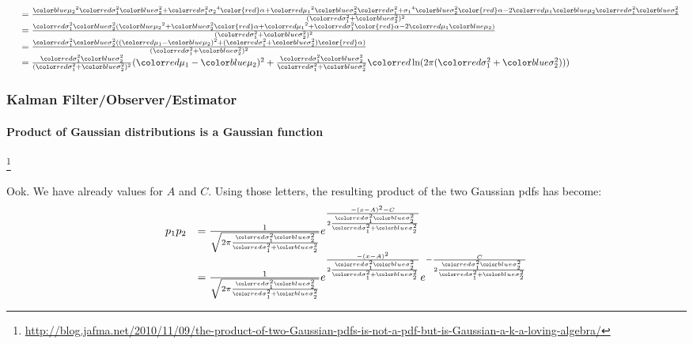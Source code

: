 \documentclass{beamer}
\newenvironment{changemargin}[2]
	{
	  	\begin{list}{}
		{
			\setlength{\topsep}{0pt}%
			\setlength{\leftmargin}{#1}%
			\setlength{\rightmargin}{#2}%
			\setlength{\listparindent}{\parindent}%
			\setlength{\itemindent}{\parindent}%
			\setlength{\parsep}{\parskip}%
		}
	  	\item[]
		}
		{\end{list}
	}
\begin{document}
\begin{frame}[plain]
\begin{changemargin}{-1.35in}{0in}
\begin{equation*}
\begin{array}{rlllllll}
&=\frac  {      {\mutwo}^2 \varone \vartwo + \varone {\stwo}^4 {\color{red}\alpha} + {\muone}^2 \vartwo \varone + {\sone}^4 \vartwo {\color{red}\alpha} - 2{\muone}{\mutwo} \varone \vartwo  }  {      (\varone + \vartwo)^2  }\\
&=\frac  {      \varone \vartwo ( {\mutwo}^2 + \vartwo {\color{red}\alpha} + {\muone}^2 + \varone {\color{red}\alpha} - 2{\muone}{\mutwo} )  }   {      (\varone + \vartwo)^2  }\\
&=\frac  {      \varone \vartwo ( ( {\muone} - {\mutwo} )^2 + (\varone + \vartwo) {\color{red}\alpha} )  }   {      (\varone + \vartwo)^2  }\\
&=\frac { \varone \vartwo }{ (\varone + \vartwo)^2 } ({\muone} - {\mutwo} )^2+\frac { \varone \vartwo }{ \varone + \vartwo } \myalpha )\\
\end{array}
\end{equation*}
\end{changemargin}
\end{frame}




\begin{frame}[plain]
\frametitle{Kalman Filter/Observer/Estimator}
\framesubtitle{Product of Gaussian distributions is a Gaussian function}

\footnote{\tiny\hspace{-0.23in} \hspace{-0.25in}
\href{http://blog.jafma.net/2010/11/09/the-product-of-two-Gaussian-pdfs-is-not-a-pdf-but-is-Gaussian-a-k-a-loving-algebra/}{http://blog.jafma.net/2010/11/09/the-product-of-two-Gaussian-pdfs-is-not-a-pdf-but-is-Gaussian-a-k-a-loving-algebra/}}
\begin{changemargin}{-1.35in}{0in}
\scriptsize
Ook. We have already values for $A$ and $C$. Using those letters, the resulting product of the two Gaussian pdfs has become:
\begin{equation*}
\begin{array}{rlllllll}
p_1p_2&=    \frac{1}{\sqrt{2 \pi \frac { \varone \vartwo }{\varone + \vartwo} }}    e^{ \frac{-(x-A)^2-C}{2 \frac{\varone \vartwo}{\varone + \vartwo}} } \\
&=    \frac{1}{\sqrt{2 \pi \frac { \varone \vartwo }{\varone + \vartwo} }}    e^{ \frac{-(x-A)^2}{2 \frac{\varone \vartwo}{\varone + \vartwo}} }   e^{- \frac {C}{2 \frac{\varone \vartwo}{\varone + \vartwo}} }
\end{array}
\end{equation*}
\end{changemargin}
\end{frame}
\end{document}
